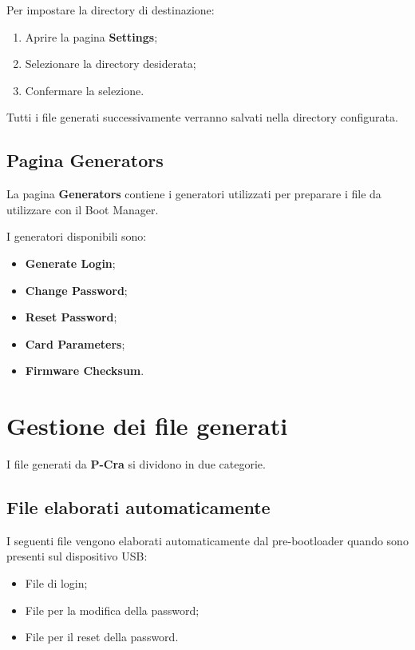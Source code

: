 \documentclass[11pt,a4paper]{article}
\newcommand{\software}{\textbf{P-Cra}}
\newcommand{\button}[1]{\textbf{#1}}
\begin{document}
Per impostare la directory di destinazione:

\begin{enumerate}
    \item Aprire la pagina \button{Settings};
    \item Selezionare la directory desiderata;
    \item Confermare la selezione.
\end{enumerate}

Tutti i file generati successivamente verranno salvati nella
directory configurata.

\subsection{Pagina Generators}

La pagina \textbf{Generators} contiene i generatori utilizzati
per preparare i file da utilizzare con il Boot Manager.

I generatori disponibili sono:

\begin{itemize}
    \item \button{Generate Login};
    \item \button{Change Password};
    \item \button{Reset Password};
    \item \button{Card Parameters};
    \item \button{Firmware Checksum}.
\end{itemize}

\section{Gestione dei file generati}

I file generati da \software{} si dividono in due categorie.

\subsection{File elaborati automaticamente}

I seguenti file vengono elaborati automaticamente dal pre-bootloader
quando sono presenti sul dispositivo USB:

\begin{itemize}
    \item File di login;
    \item File per la modifica della password;
    \item File per il reset della password.
\end{itemize}
\end{document}
